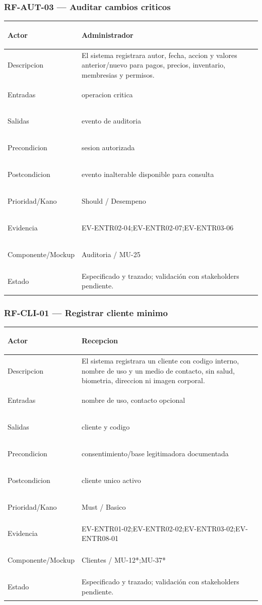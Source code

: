 \documentclass[11pt,a4paper,twoside]{article}
\begin{document}
\subsubsection{RF-AUT-03 — Auditar cambios criticos}
\begingroup
\renewcommand{\arraystretch}{1.12}
\setlength{\tabcolsep}{5pt}
\begin{tabularx}{\textwidth}{|>{\bfseries\raggedright\arraybackslash}p{3.35cm}|>{\raggedright\arraybackslash}X|}
\hline
Actor & Administrador \\ \hline
Descripcion & El sistema registrara autor, fecha, accion y valores anterior/nuevo para pagos, precios, inventario, membresias y permisos. \\ \hline
Entradas & operacion critica \\ \hline
Salidas & evento de auditoria \\ \hline
Precondicion & sesion autorizada \\ \hline
Postcondicion & evento inalterable disponible para consulta \\ \hline
Prioridad/Kano & Should / Desempeno \\ \hline
Evidencia & EV-ENTR02-04;EV-ENTR02-07;EV-ENTR03-06 \\ \hline
Componente/Mockup & Auditoria / MU-25 \\ \hline
Estado & Especificado y trazado; validación con stakeholders pendiente. \\ \hline
\end{tabularx}
\endgroup

\subsubsection{RF-CLI-01 — Registrar cliente minimo}
\begingroup
\renewcommand{\arraystretch}{1.12}
\setlength{\tabcolsep}{5pt}
\begin{tabularx}{\textwidth}{|>{\bfseries\raggedright\arraybackslash}p{3.35cm}|>{\raggedright\arraybackslash}X|}
\hline
Actor & Recepcion \\ \hline
Descripcion & El sistema registrara un cliente con codigo interno, nombre de uso y un medio de contacto, sin salud, biometria, direccion ni imagen corporal. \\ \hline
Entradas & nombre de uso, contacto opcional \\ \hline
Salidas & cliente y codigo \\ \hline
Precondicion & consentimiento/base legitimadora documentada \\ \hline
Postcondicion & cliente unico activo \\ \hline
Prioridad/Kano & Must / Basico \\ \hline
Evidencia & EV-ENTR01-02;EV-ENTR02-02;EV-ENTR03-02;EV-ENTR08-01 \\ \hline
Componente/Mockup & Clientes / MU-12*;MU-37* \\ \hline
Estado & Especificado y trazado; validación con stakeholders pendiente. \\ \hline
\end{tabularx}
\endgroup
\end{document}
